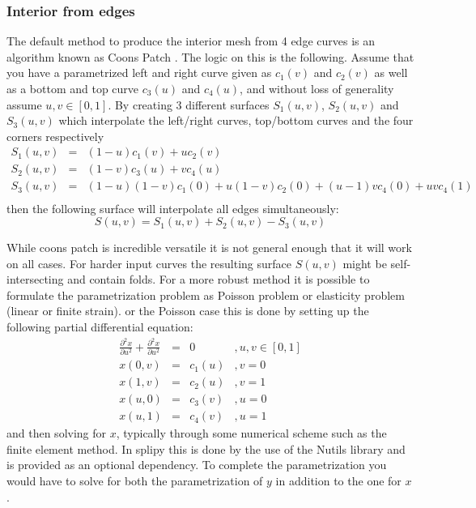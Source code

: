 \documentclass[preprint,12pt, a4paper]{elsarticle}
\begin{document}
\subsubsection{Interior from edges}
\label{sec:interior-from-edges}
The default method to produce the interior mesh from 4 edge curves is an algorithm known as Coons Patch \cite{coons1967sfc}. The logic on this is the following. Assume that you have a parametrized left and right curve given as $c_1(v)$ and $c_2(v)$ as well as a bottom and top curve $c_3(u)$ and $c_4(u)$, and without loss of generality assume $u,v\in[0,1]$. By creating 3 different surfaces $S_1(u,v)$, $S_2(u,v)$ and $S_3(u,v)$ which interpolate the left/right curves, top/bottom curves and the four corners respectively
\begin{eqnarray*}
    S_1(u,v) & = & (1-u)c_1(v) + uc_2(v) \\
    S_2(u,v) & = & (1-v)c_3(u) + vc_4(u) \\
    S_3(u,v) & = & (1-u)(1-v)c_1(0) + u(1-v)c_2(0) + (u-1)vc_4(0) + uvc_4(1) \\
\end{eqnarray*}
then the following surface will interpolate all edges simultaneously:
\begin{equation}
    S(u,v)   = S_1(u,v) + S_2(u,v) - S_3(u,v)
\end{equation}

While coons patch is incredible versatile it is not general enough that it will work on all cases.
For harder input curves the resulting surface $S(u,v)$ might be self-intersecting and contain folds.
For a more robust method it is possible to formulate the parametrization problem as Poisson problem or elasticity problem (linear or finite strain).
or the Poisson case this is done by setting up the following partial differential equation:
\begin{equation}
    \begin{array}{rcll}
    \frac{\partial^2 x}{\partial u^2} + \frac{\partial^2 x}{\partial u^2} & = & 0 &, u,v\in [0,1] \\
    x(0,v) & = & c_1(u) &, v = 0 \\
    x(1,v) & = & c_2(u) &, v = 1 \\
    x(u,0) & = & c_3(v) &, u = 0 \\
    x(u,1) & = & c_4(v) &, u = 1
    \end{array}
\end{equation}
and then solving for $x$, typically through some numerical scheme such as the finite element method.
In splipy this is done by the use of the Nutils library \cite{van_zwieten2018n} and is provided as an optional dependency.
To complete the parametrization you would have to solve for both the parametrization of $y$ in addition to the one for $x$.
\end{document}
